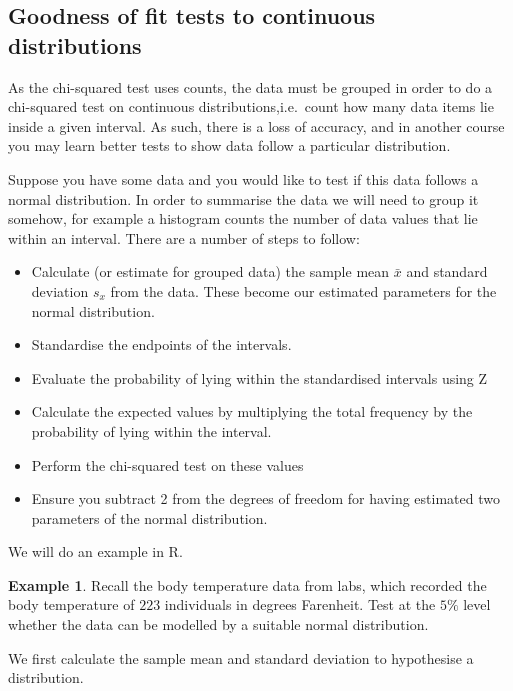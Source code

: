 \documentclass[
]{book}
\theoremstyle{definition}
\theoremstyle{definition}
\newtheorem{example}{Example}[chapter]
\theoremstyle{definition}
\theoremstyle{definition}
\theoremstyle{remark}
\begin{document}
\hypertarget{goodness-of-fit-tests-to-continuous-distributions}{%
\subsection{Goodness of fit tests to continuous distributions}\label{goodness-of-fit-tests-to-continuous-distributions}}

As the chi-squared test uses counts, the data must be grouped in order to do a chi-squared test on continuous distributions,i.e.~count how many data items lie inside a given interval. As such, there is a loss of accuracy, and in another course you may learn better tests to show data follow a particular distribution.

Suppose you have some data and you would like to test if this data follows a normal distribution. In order to summarise the data we will need to group it somehow, for example a histogram counts the number of data values that lie within an interval. There are a number of steps to follow:

\begin{itemize}
\item
  Calculate (or estimate for grouped data) the sample mean \(\bar{x}\) and standard deviation \(s_x\) from the data. These become our estimated parameters for the normal distribution.
\item
  Standardise the endpoints of the intervals.
\item
  Evaluate the probability of lying within the standardised intervals using Z
\item
  Calculate the expected values by multiplying the total frequency by the probability of lying within the interval.
\item
  Perform the chi-squared test on these values
\item
  Ensure you subtract 2 from the degrees of freedom for having estimated two parameters of the normal distribution.
\end{itemize}

We will do an example in R.

\begin{example}
Recall the body temperature data from labs, which recorded the body temperature of \(223\) individuals in degrees Farenheit. Test at the \(5\%\) level whether the data can be modelled by a suitable normal distribution.
\end{example}

We first calculate the sample mean and standard deviation to hypothesise a distribution.
\end{document}
